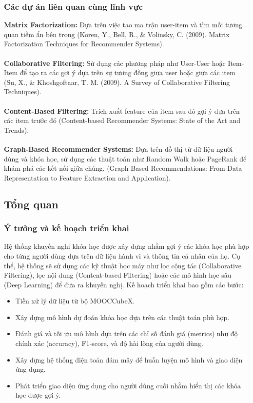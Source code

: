 \subsubsection{Các dự án liên quan cùng lĩnh vực}
\textbf{Matrix Factorization:} Dựa trên việc tạo ma trận user-item và tìm mối tương quan tiềm ẩn bên trong (Koren, Y., Bell, R., \& Volinsky, C. (2009). Matrix Factorization Techniques for Recommender Systems).\\
\\
\textbf{Collaborative Filtering:}  Sử dụng các phương pháp như User-User hoặc Item-Item để tạo ra các gợi ý dựa trên sự tương đồng giữa user hoặc giữa các item (Su, X., \& Khoshgoftaar, T. M. (2009). A Survey of Collaborative Filtering Techniques).\\
\\
\textbf{Content-Based Filtering:} Trích xuất feature của item sau đó gợi ý dựa trên các item trước đó (Content-based Recommender Systems: State of the Art and Trends).\\
\\
\textbf{Graph-Based Recommender Systems:} Dựa trên đồ thị từ dữ liệu người dùng và khóa học, sử dụng các thuật toán như Random Walk hoặc PageRank để khám phá các kết nối giữa chúng. (Graph Based Recommendations: From Data Representation to Feature Extraction and Application).\\
\subsection{Tổng quan}
\subsubsection{Ý tưởng và kế hoạch triển khai}
Hệ thống khuyến nghị khóa học được xây dựng nhằm gợi ý các khóa học phù hợp cho từng người dùng dựa trên dữ liệu hành vi và thông tin cá nhân của họ. Cụ thể, hệ thống sẽ sử dụng các kỹ thuật học máy như lọc cộng tác (Collaborative Filtering), lọc nội dung (Content-based Filtering) hoặc các mô hình học sâu (Deep Learning) để đưa ra khuyến nghị. Kế hoạch triển khai bao gồm các bước:
\begin{itemize}
    \item Tiền xử lý dữ liệu từ bộ MOOCCubeX.
    \item Xây dựng mô hình dự đoán khóa học dựa trên các thuật toán phù hợp.
    \item Đánh giá và tối ưu mô hình dựa trên các chỉ số đánh giá (metrics) như độ chính xác (accuracy), F1-score, và độ hài lòng của người dùng.
    \item Xây dựng hệ thống điện toán đám mây để huấn luyện mô hình và giao diện ứng dụng.
    \item Phát triển giao diện ứng dụng cho người dùng cuối nhằm hiển thị các khóa học được gợi ý.
\end{itemize}

